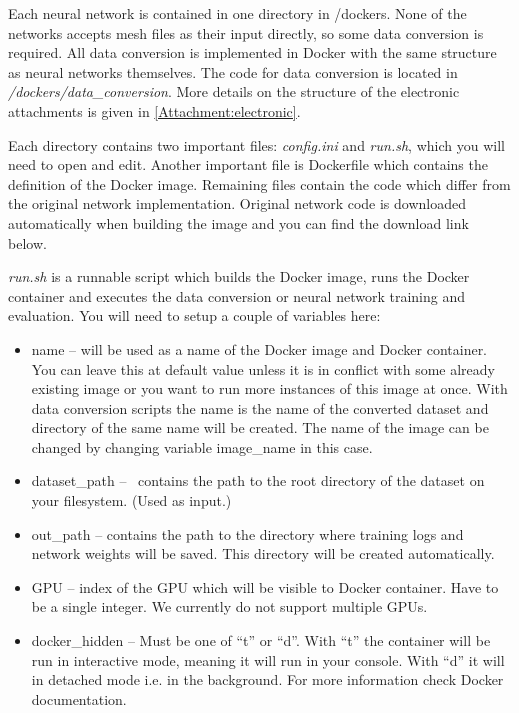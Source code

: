Each neural network is contained in one directory in /dockers. None of the networks accepts mesh files as their input directly, so some data conversion is required. All data conversion is implemented in Docker with the same structure as neural networks themselves. The code for data conversion is located in \textit{/dockers/data\_conversion}. More details on the structure of the electronic attachments is given in \autoref{Attachment:electronic}.

Each directory contains two important files: \textit{config.ini} and \textit{run.sh}, which you will need to open and edit. Another important file is Dockerfile which contains the definition of the Docker image. Remaining files contain the code which differ from the original network implementation. Original network code is downloaded automatically when building the image and you can find the download link below.

\textit{run.sh} is a runnable script which builds the Docker image, runs the Docker container and executes the data conversion or neural network training and evaluation. You will need to setup a couple of variables here:

\begin{itemize}
	\item  {name -- will be used as a name of the Docker image and Docker container. You can leave this at default value unless it is in conflict with some already existing image or you want to run more instances of this image at once. With data conversion scripts the name is the name of the converted dataset and directory of the same name will be created. The name of the image can be changed by changing variable image\_name in this case.}
	\item{ dataset\_path --  contains the path to the root directory of the dataset on your filesystem. (Used as input.)}
	\item{out\_path -- contains the path to the directory where training logs and network weights will be saved. This directory will be created automatically.}
	\item{ GPU -- index of the GPU which will be visible to Docker container. Have to be a single integer. We currently do not support multiple GPUs.}
	\item{docker\_hidden -- Must be one of ``t'' or ``d''. With ``t'' the container will be run in interactive mode, meaning it will run in your console. With ``d'' it will in detached mode i.e. in the background. For more information check Docker documentation.}
\end{itemize}

